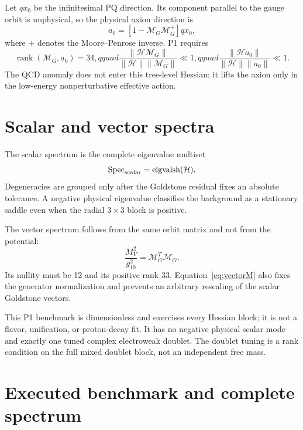 \documentclass[11pt]{article}
\newcommand{\cH}{\mathcal H}
\newcommand{\cM}{\mathcal M}
\begin{document}
Let $q x_0$ be the infinitesimal PQ direction.  Its component parallel to
the gauge orbit is unphysical, so the physical axion direction is
\begin{equation}
 a_0=\left[1-\cM_G\cM_G^+\right]q x_0,
 \label{eq:axionproject}
\end{equation}
where $+$ denotes the Moore--Penrose inverse.  P1 requires
\begin{equation}
 \operatorname{rank}(\cM_G,a_0)=34,qquad
 \frac{\|\cH\cM_G\|}{\|\cH\|\|\cM_G\|}\ll1,qquad
 \frac{\|\cH a_0\|}{\|\cH\|\|a_0\|}\ll1.
\end{equation}
The QCD anomaly does not enter this tree-level Hessian; it lifts the axion
only in the low-energy nonperturbative effective action.

\section{Scalar and vector spectra}

The scalar spectrum is the complete eigenvalue multiset
\begin{equation}
 \operatorname{Spec}_{\rm scalar}=\operatorname{eigvalsh}(\cH).
\end{equation}
Degeneracies are grouped only after the Goldstone residual fixes an absolute
tolerance.  A negative physical eigenvalue classifies the background as a
stationary saddle even when the radial $3\times3$ block is positive.

The vector spectrum follows from the same orbit matrix and not from the
potential:
\begin{equation}
 \frac{M_V^2}{g_{10}^2}=\cM_G^T\cM_G.
 \label{eq:vectorM}
\end{equation}
Its nullity must be 12 and its positive rank 33.  Equation~\eqref{eq:vectorM}
also fixes the generator normalization and prevents an arbitrary rescaling
of the scalar Goldstone vectors.

This P1 benchmark is dimensionless and exercises every Hessian block; it is
not a flavor, unification, or proton-decay fit.  It has no negative physical
scalar mode and exactly one tuned complex electroweak doublet.  The doublet
tuning is a rank condition on the full mixed doublet block, not an
independent free mass.

\section{Executed benchmark and complete spectrum}
\end{document}
